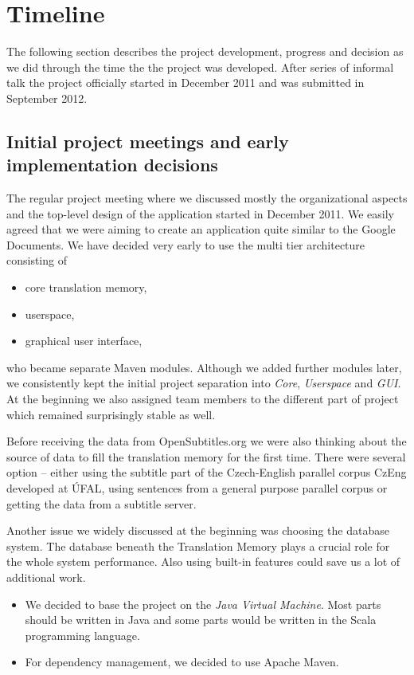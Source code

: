 \section{Timeline}

The following section describes the project development, progress and decision as we did through the time the the project was developed. After series of informal talk the project officially started in December 2011 and was submitted in September 2012.

\subsection{Initial project meetings and early implementation decisions}

The regular project meeting where we discussed mostly the organizational aspects and the top-level design of the application started in December 2011. We easily agreed that we were aiming to create an application quite similar to the Google Documents. We have decided very early to use the multi tier architecture consisting of

\begin{itemize}
\item core translation memory,
\item userspace,
\item graphical user interface,
\end{itemize}

who became separate Maven modules. Although we added further modules later, we consistently kept the initial project separation into \emph{Core}, \emph{Userspace} and \emph{GUI}. At the beginning we also assigned team members to the different part of project which remained surprisingly stable as well. 

Before receiving the data from OpenSubtitles.org we were also thinking about the source of data to fill the translation memory for the first time. There were several option -- either using the subtitle part of the Czech-English parallel corpus CzEng developed at ÚFAL, using sentences from a general purpose parallel corpus or getting the data from a subtitle server.

Another issue we widely discussed at the beginning was choosing the database system. The database beneath the Translation Memory plays a crucial role for the whole system performance. Also using built-in features could save us a lot of additional work.



\begin{itemize}
	\item We decided to base the project on the \emph{Java Virtual Machine}. Most parts should be written in Java and some parts would be written in the Scala programming language.
	\item For dependency management, we decided to use Apache Maven.
\end{itemize}

